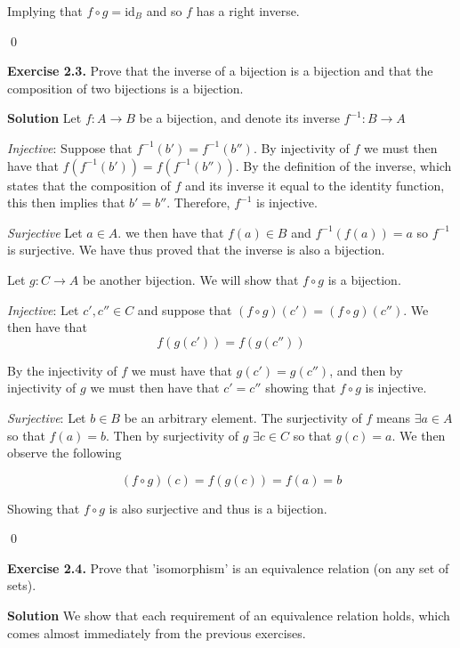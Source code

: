 \documentclass[titlepage]{article}
\begin{document}
Implying that $f \circ g = \text{id}_B$ and so $f$ has a right inverse.

\qed

\bigskip

\textbf{Exercise 2.3.} Prove that the inverse of a bijection is a bijection and that the composition of two bijections is a bijection.

\medskip

\textbf{Solution} Let $f:A \to B$ be a bijection, and denote its inverse $f^{-1}:B \to A$

\textit{Injective}: Suppose that $f^{-1}(b') = f^{-1}(b'')$. By injectivity of $f$ we must then have that $f(f^{-1}(b')) = f(f^{-1}(b''))$. By the definition of the inverse, which states that the composition of $f$ and its inverse it equal to the identity function, this then implies that $b' = b''$. Therefore, $f^{-1}$ is injective.

\smallskip

\textit{Surjective} Let $a \in A$. we then have that $f(a) \in B$ and $f^{-1}(f(a)) = a$ so $f^{-1}$ is surjective. We have thus proved that the inverse is also a bijection.

\medskip

Let $g:C \to A$ be another bijection. We will show that $f \circ g$ is a bijection.

\textit{Injective}: Let $c',c'' \in C$ and suppose that $(f \circ g)(c') = (f \circ g)(c'')$. We then have that
\[ f(g(c')) = f(g(c'')) \]

By the injectivity of $f$ we must have that $g(c')=g(c'')$, and then by injectivity of $g$ we must then have that $c' = c''$ showing that $f \circ g$ is injective.

\smallskip

\textit{Surjective}: Let $b \in B$ be an arbitrary element. The surjectivity of $f$ means $\exists a \in A$ so that $f(a) = b$. Then by surjectivity of $g$ $\exists c \in C$ so that $g(c)=a$. We then observe the following

\[ (f \circ g)(c) = f(g(c)) = f(a) = b \]

Showing that $f \circ g$ is also surjective and thus is a bijection.

\qed

\bigskip

\textbf{Exercise 2.4.} Prove that 'isomorphism' is an equivalence relation (on any set of sets).

\smallskip

\textbf{Solution} We show that each requirement of an equivalence relation holds, which comes almost immediately from the previous exercises.
\end{document}
